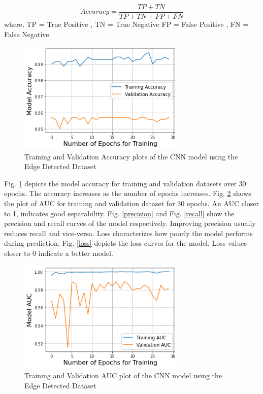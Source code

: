 \documentclass[conference]{IEEEtran}
\begin{document}
\begin{equation}
   Accuracy = \frac{TP +TN}{TP +TN + FP +FN}
\end{equation}
where,
\newline
TP = True Positive , TN = True Negative \newline 
FP = False Positive , FN = False Negative

\begin{figure}[htpb]
\centerline{\includegraphics[width=8cm]{accuracy.png}}
\caption{Training and Validation Accuracy plots of the CNN model using the Edge Detected Dataset}
\label{accuracy}
\end{figure}

Fig. \ref{accuracy} depicts the model accuracy for training and validation datasets over 30 epochs. The accuracy increases as the number of epochs increases. Fig. \ref{auc} shows the plot of AUC for training and validation dataset for 30 epochs. An AUC closer to 1, indicates good separability. Fig. \ref{precision} and Fig. \ref{recall} show the precision and recall curves of the model respectively. Improving precision usually reduces recall and vice-versa. Loss characterizes how poorly the model performs during prediction. Fig. \ref{loss} depicts the loss curves for the model. Loss values closer to 0 indicate a better model.

\begin{figure}[htpb]
\centerline{\includegraphics[width=8cm]{auc.png}}

\caption{Training and Validation AUC plot of the CNN model using the Edge Detected Dataset}
\label{auc}
\end{figure}
\end{document}
